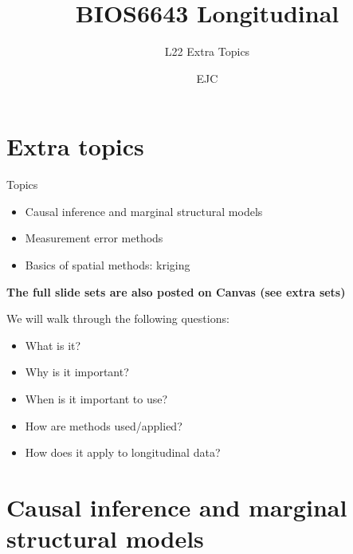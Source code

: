 \documentclass[
  9pt,
  ignorenonframetext,
]{beamer}
\title{BIOS6643 Longitudinal}
\subtitle{L22 Extra Topics}
\author{EJC}
\date{}
\institute{Department of Biostatistics \& Informatics}
\begin{document}
\frame{\titlepage}

\begin{frame}[allowframebreaks]
  \tableofcontents[hideallsubsections]
\end{frame}
\hypertarget{extra-topics}{%
\section{Extra topics}\label{extra-topics}}

\begin{frame}{Topics}
\protect\hypertarget{topics}{}
\begin{itemize}
\item
  Causal inference and marginal structural models
\item
  Measurement error methods
\item
  Basics of spatial methods: kriging
\end{itemize}

\textbf{The full slide sets are also posted on Canvas (see extra sets)}
\end{frame}

\begin{frame}{}
\protect\hypertarget{section}{}
We will walk through the following questions:

\begin{itemize}
\item
  What is it?
\item
  Why is it important?
\item
  When is it important to use?
\item
  How are methods used/applied?
\item
  How does it apply to longitudinal data?
\end{itemize}
\end{frame}

\hypertarget{causal-inference-and-marginal-structural-models}{%
\section{Causal inference and marginal structural
models}\label{causal-inference-and-marginal-structural-models}}
\end{document}

